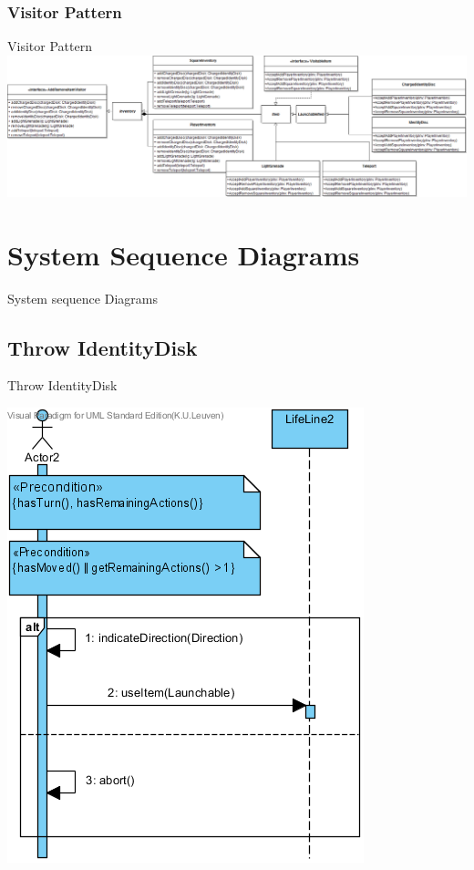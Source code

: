 \documentclass[t]{beamer}
\begin{document}
\subsubsection{Visitor Pattern}
\begin{frame}{Visitor Pattern}
\vspace{0.4in}
\includegraphics[width=1\linewidth]{images/Visitor2}

\end{frame}


\section{System Sequence Diagrams}

\begin{frame}{System sequence Diagrams}
\begin{multicols}{2}
\tableofcontents[currentsection]
\end{multicols}
\end{frame}
\subsection{Throw IdentityDisk}
\begin{frame}{Throw IdentityDisk}
\begin{center}
\includegraphics[scale=0.5]{images/ChooseDirectionSSD}
\end{center}
\end{frame}
\end{document}
